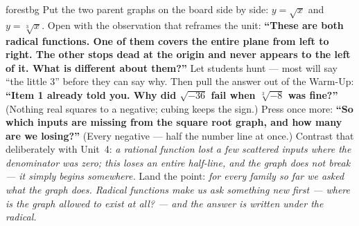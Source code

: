 \documentclass[10pt]{article}
\begin{document}
\begin{skillbox}[Hook]{forestbg}
    Put the two parent graphs on the board side by side: $y=\sqrt{x}$ and $y=\sqrt[3]{x}$. Open with
    the observation that reframes the unit: \textbf{``These are both radical functions. One of them
    covers the entire plane from left to right. The other stops dead at the origin and never appears
    to the left of it. What is different about them?''} Let students hunt --- most will say ``the
    little 3'' before they can say why. Then pull the answer out of the Warm-Up: \textbf{``Item 1
    already told you. Why did $\sqrt{-36}$ fail when $\sqrt[3]{-8}$ was fine?''} (Nothing real squares
    to a negative; cubing keeps the sign.) Press once more: \textbf{``So which inputs are missing from
    the square root graph, and how many are we losing?''} (Every negative --- half the number line at
    once.) Contrast that deliberately with Unit~4: \emph{a rational function lost a few scattered
    inputs where the denominator was zero; this loses an entire half-line, and the graph does not
    break --- it simply begins somewhere.} Land the point: \emph{for every family so far we asked what
    the graph does. Radical functions make us ask something new first --- where is the graph allowed to
    exist at all? --- and the answer is written under the radical.}
\end{skillbox}
\end{document}
